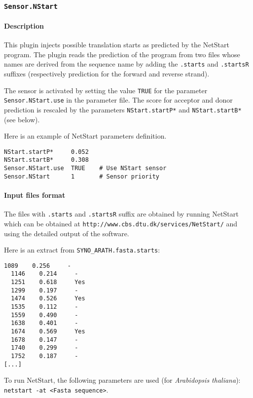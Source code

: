 
\subsubsection{\texttt{Sensor.NStart}}

\paragraph{Description}

This plugin injects possible translation starts as predicted by the
NetStart program. The plugin reads the prediction of the
program from two files whose names are derived from the sequence name
by adding the \texttt{.starts} and \texttt{.startsR} suffixes
(respectively prediction for the forward and reverse strand).

The sensor is activated by setting the value \texttt{TRUE} for the parameter
\texttt{Sensor.NStart.use} in the parameter file. The score for acceptor
and donor prediction is rescaled by the parameters {\tt NStart.startP*} and
{\tt NStart.startB*} (see below).

Here is an example of NetStart parameters definition.
\begin{Verbatim}[fontsize=\small]
NStart.startP*     0.052
NStart.startB*     0.308
Sensor.NStart.use  TRUE    # Use NStart sensor
Sensor.NStart      1       # Sensor priority
\end{Verbatim}

\paragraph{Input files format}

The files with \texttt{.starts} and \texttt{.startsR} suffix are
obtained by running NetStart which can be obtained at
\texttt{http://www.cbs.dtu.dk/services/NetStart/} and using the
detailed output of the software.

Here is an extract from \texttt{SYNO\_ARATH.fasta.starts}:
\begin{Verbatim}[fontsize=\small]
  1089    0.256     -
  1146    0.214     -
  1251    0.618     Yes
  1299    0.197     -
  1474    0.526     Yes
  1535    0.112     -
  1559    0.490     -
  1638    0.401     -
  1674    0.569     Yes
  1678    0.147     -
  1740    0.299     -
  1752    0.187     -
[...]
\end{Verbatim}

To run NetStart, the following parameters are used (for \emph{Arabidopsis
thaliana}): \texttt{netstart -at <Fasta sequence>}.

